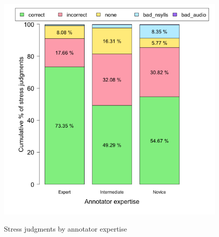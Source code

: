			
			\begin{figure}[htb]
				\centering
				\caption{Stress judgments by annotator expertise}
				\includegraphics[width=.9\textwidth]{img/plots/pctJudgmentsByExpertise-NoTitle}
				\label{fig:agreement:expertisebars}
			\end{figure}
			
%				
			
			
			

